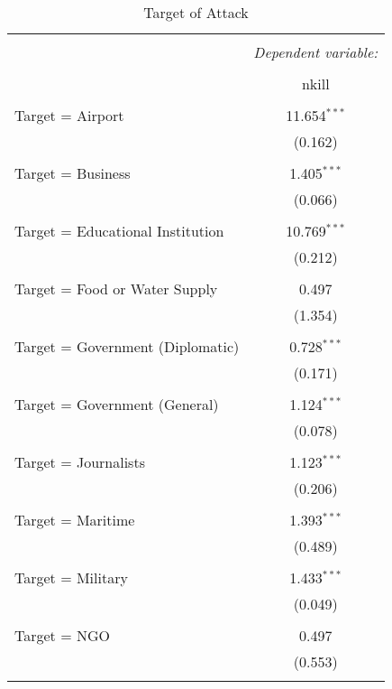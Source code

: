 
\begin{table}[!htbp] \centering 
  \caption{Target of Attack} 
  \label{} 
\begin{tabular}{@{\extracolsep{5pt}}lc} 
\\[-1.8ex]\hline 
\hline \\[-1.8ex] 
 & \multicolumn{1}{c}{\textit{Dependent variable:}} \\ 
\cline{2-2} 
\\[-1.8ex] & nkill \\ 
\hline \\[-1.8ex] 
 Target = Airport & 11.654$^{***}$ \\ 
  & (0.162) \\ 
  & \\ 
 Target = Business & 1.405$^{***}$ \\ 
  & (0.066) \\ 
  & \\ 
 Target = Educational Institution & 10.769$^{***}$ \\ 
  & (0.212) \\ 
  & \\ 
 Target = Food or Water Supply & 0.497 \\ 
  & (1.354) \\ 
  & \\ 
 Target = Government (Diplomatic) & 0.728$^{***}$ \\ 
  & (0.171) \\ 
  & \\ 
 Target = Government (General) & 1.124$^{***}$ \\ 
  & (0.078) \\ 
  & \\ 
 Target = Journalists & 1.123$^{***}$ \\ 
  & (0.206) \\ 
  & \\ 
 Target = Maritime & 1.393$^{***}$ \\ 
  & (0.489) \\ 
  & \\ 
 Target = Military & 1.433$^{***}$ \\ 
  & (0.049) \\ 
  & \\ 
 Target = NGO & 0.497 \\ 
  & (0.553) \\ 
  & \\ 

\end{tabular}
\end{table}
